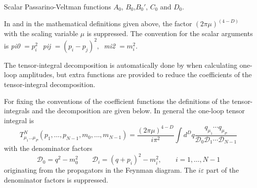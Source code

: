  {Scalar Passarino-Veltman functions $A_0$, $B_0$,$B_0'$, $C_0$ and $D_0$.}

In \fc and in the mathematical definitions given above,
the factor $(2\pi\mu)^{(4-D)}$ with the scaling variable $\mu$ is suppressed.
The convention for the scalar arguments is
{\sl pi0} $= p_i^2 \,\; \;${\sl pij} $= (p_i - p_j)^2, \; \; ${\sl mi2} $= m_i^2$.

\beom
{}
\enom

The tensor-integral decomposition is automatically done by
\fc when calculating one-loop amplitudes,
but extra functions are provided to reduce the coefficients of the
tensor-integral decomposition.

For fixing the conventions of the coefficient functions
the definitions of the tensor-integrals and the decomposition are given below.
In general the one-loop tensor integral is
\[
T^{N}_{\mu_{1}\ldots\mu_{P}} (p_{1},\ldots,p_{N-1},m_{0},\ldots,m_{N-1})=
\frac{(2\pi\mu)^{4-D}}{i\pi^{2}}\int d^{D}\!q
\frac{q_{\mu _{1}}\cdots q_{\mu _{P}}}{
{\mathcal D}_{0}{\mathcal D}_{1}\cdots
{\mathcal D}_{N-1}
}
\]
with the denominator factors
\[
{\mathcal D}_{0}=
q^{2}-m_{0}^{2} \nonumber \qquad
{\mathcal D}_{i}=
(q+p_{i})^{2}-m_{i}^{2}, \nonumber \qquad i=1,\ldots,N-1 \nonumber
\]
originating from the propagators in the Feynman diagram.
The $i \varepsilon $ part of the denominator factors is suppressed.

